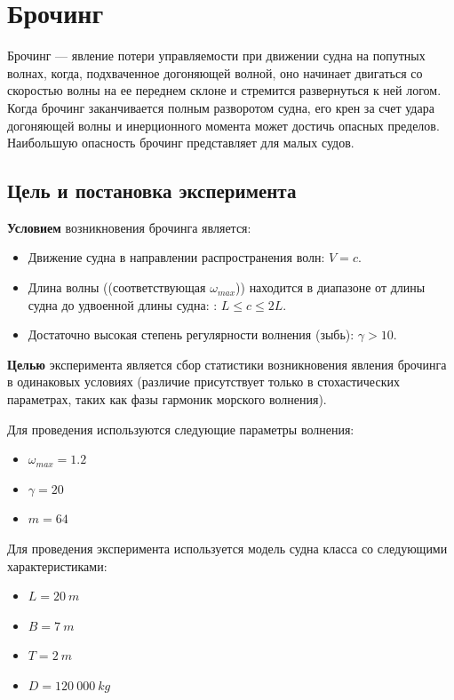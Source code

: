 \section{Брочинг}

Брочинг --- явление потери управляемости при движении судна на попутных волнах, когда, подхваченное догоняющей волной, оно начинает двигаться со скоростью волны на ее переднем склоне и стремится развернуться к ней логом. Когда брочинг заканчивается полным разворотом судна, его крен за счет удара догоняющей волны и инерционного момента может достичь опасных пределов. Наибольшую опасность брочинг представляет для малых судов.

\subsection{Цель и постановка эксперимента}

\textbf{Условием} возникновения брочинга является:
\begin{itemize}
	\item	Движение судна в направлении распространения волн: $V=c$.
	\item	Длина волны ((соответствующая $\omega_{max}$)) находится в диапазоне от длины судна до удвоенной длины судна:
			: $L \leqslant c \leqslant 2L$.
	\item	Достаточно высокая степень регулярности волнения (зыбь): $\gamma > 10$.
\end{itemize}

\textbf{Целью} эксперимента является сбор статистики возникновения явления брочинга в одинаковых условиях (различие присутствует только в стохастических параметрах, таких как фазы гармоник морского волнения).

Для проведения используются следующие параметры волнения:
\begin{itemize}
	\item	$\omega_{max} = 1.2$
	\item	$\gamma = 20$
	\item	$m = 64$
\end{itemize}

Для проведения эксперимента используется модель судна класса  со следующими характеристиками:
\begin{itemize}
	\item	$L = 20\ m$
	\item	$B = 7\ m$
	\item	$T = 2\ m$
	\item	$D = 120\ 000\ kg$
\end{itemize}

